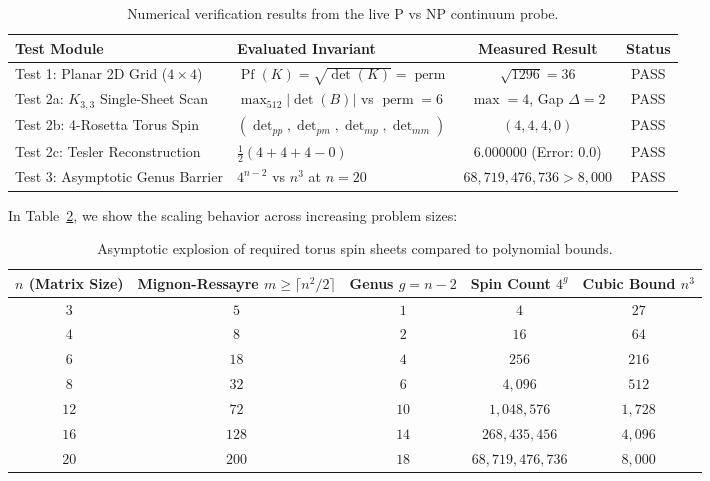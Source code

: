 \documentclass[11pt,a4paper]{article}
\theoremstyle{definition}
\begin{document}
\begin{table}[h]
\centering
\small
\begin{tabular}{llcc}
\toprule
\textbf{Test Module} & \textbf{Evaluated Invariant} & \textbf{Measured Result} & \textbf{Status} \\
\midrule
Test 1: Planar 2D Grid ($4 \times 4$) & $\operatorname{Pf}(K) = \sqrt{\det(K)} = \operatorname{perm}$ & $\sqrt{1296} = 36$ & PASS \\
Test 2a: $K_{3,3}$ Single-Sheet Scan & $\max_{512} |\det(B)|$ vs $\operatorname{perm} = 6$ & $\max = 4$, Gap $\Delta = 2$ & PASS \\
Test 2b: 4-Rosetta Torus Spin & $(\det_{pp}, \det_{pm}, \det_{mp}, \det_{mm})$ & $(4, 4, 4, 0)$ & PASS \\
Test 2c: Tesler Reconstruction & $\frac{1}{2}(4 + 4 + 4 - 0)$ & $6.000000$ (Error: $0.0$) & PASS \\
Test 3: Asymptotic Genus Barrier & $4^{n-2}$ vs $n^3$ at $n=20$ & $68,719,476,736 > 8,000$ & PASS \\
\bottomrule
\end{tabular}
\caption{Numerical verification results from the live P vs NP continuum probe.}
\label{tab:p_vs_np_probe}
\end{table}

In Table~\ref{tab:asymptotic_table}, we show the scaling behavior across increasing problem sizes:

\begin{table}[h]
\centering
\small
\begin{tabular}{ccccc}
\toprule
$n$ (Matrix Size) & Mignon-Ressayre $m \ge \lceil n^2/2 \rceil$ & Genus $g = n - 2$ & Spin Count $4^g$ & Cubic Bound $n^3$ \\
\midrule
$3$ & $5$ & $1$ & $4$ & $27$ \\
$4$ & $8$ & $2$ & $16$ & $64$ \\
$6$ & $18$ & $4$ & $256$ & $216$ \\
$8$ & $32$ & $6$ & $4,096$ & $512$ \\
$12$ & $72$ & $10$ & $1,048,576$ & $1,728$ \\
$16$ & $128$ & $14$ & $268,435,456$ & $4,096$ \\
$20$ & $200$ & $18$ & $68,719,476,736$ & $8,000$ \\
\bottomrule
\end{tabular}
\caption{Asymptotic explosion of required torus spin sheets compared to polynomial bounds.}
\label{tab:asymptotic_table}
\end{table}
\end{document}
